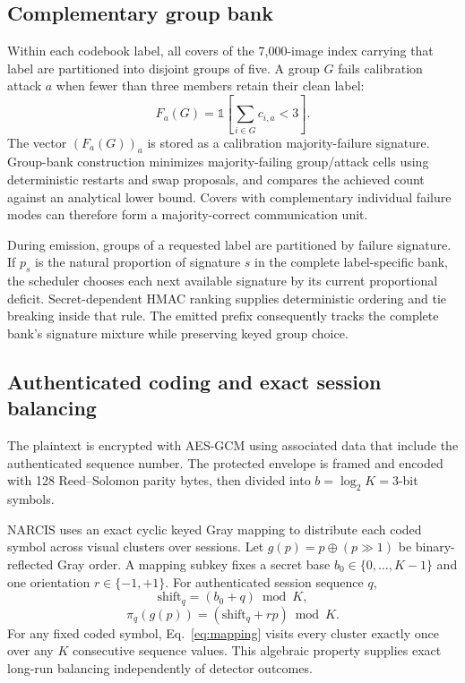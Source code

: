 \subsection{Complementary group bank}

Within each codebook label, all covers of the 7,000-image index carrying that label are partitioned into disjoint groups of five. A group $G$ fails calibration attack $a$ when fewer than three members retain their clean label:
\begin{equation}
 F_a(G)=\mathbb{1}\!\left[\sum_{i\in G} c_{i,a}<3\right].
\end{equation}
The vector $(F_a(G))_a$ is stored as a calibration majority-failure signature. Group-bank construction minimizes majority-failing group/attack cells using deterministic restarts and swap proposals, and compares the achieved count against an analytical lower bound. Covers with complementary individual failure modes can therefore form a majority-correct communication unit.

During emission, groups of a requested label are partitioned by failure signature. If $p_s$ is the natural proportion of signature $s$ in the complete label-specific bank, the scheduler chooses each next available signature by its current proportional deficit. Secret-dependent HMAC ranking supplies deterministic ordering and tie breaking inside that rule. The emitted prefix consequently tracks the complete bank's signature mixture while preserving keyed group choice.

\subsection{Authenticated coding and exact session balancing}

The plaintext is encrypted with AES-GCM using associated data that include the authenticated sequence number. The protected envelope is framed and encoded with 128 Reed--Solomon parity bytes, then divided into $b=\log_2K=3$-bit symbols.

NARCIS uses an exact cyclic keyed Gray mapping to distribute each coded symbol across visual clusters over sessions. Let $g(p)=p\oplus(p\!\gg\!1)$ be binary-reflected Gray order. A mapping subkey fixes a secret base $b_0\in\{0,\ldots,K-1\}$ and one orientation $r\in\{-1,+1\}$. For authenticated session sequence $q$,
\begin{equation}
 \mathrm{shift}_q=(b_0+q)\bmod K,
\end{equation}
\begin{equation}
 \pi_q(g(p))=(\mathrm{shift}_q+r p)\bmod K.
 \label{eq:mapping}
\end{equation}
For any fixed coded symbol, Eq.~\eqref{eq:mapping} visits every cluster exactly once over any $K$ consecutive sequence values. This algebraic property supplies exact long-run balancing independently of detector outcomes.

